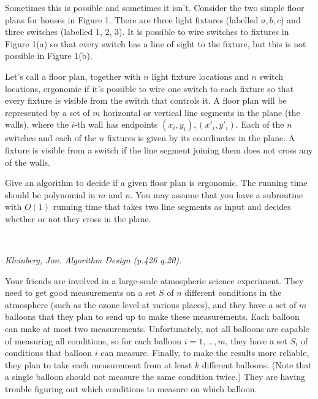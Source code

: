 \documentclass[solutionorbox,answers]{exam}
\begin{document}
\begin{questions}
Sometimes this is possible and sometimes it isn't. Consider the two
simple floor plans for houses in Figure 1. There are three light fixtures
(labelled $a, b, c$) and three switches (labelled 1, 2, 3). It is possible to wire switches to fixtures in Figure 1(a) so that every switch has a line of
sight to the fixture, but this is not possible in Figure 1(b).

Let's call a floor plan, together with $n$ light fixture locations and $n$
switch locations, ergonomic if it's possible to wire one switch to each
fixture so that every fixture is visible from the switch that controls it.
A floor plan will be represented by a set of $m$ horizontal or vertical
line segments in the plane (the walls), where the $i$-th wall has endpoints
$(x_i, y_i), (x'_i, y'_i)$. Each of the $n$ switches and each of the $n$ fixtures is given by its coordinates in the plane. A fixture is visible from a switch if the line segment joining them does not cross any of the walls.

Give an algorithm to decide if a given floor plan is ergonomic. The
running time should be polynomial in $m$ and $n$. You may assume that you
have a subroutine with $O(1)$ running time that takes two line segments as input and decides whether or not they cross in the plane.

\newpage

\begin{solutionbox}{} \\

\end{solutionbox}

\newpage

\question \textit{Kleinberg, Jon. Algorithm Design (p.426 q.20).}

Your friends are involved in a large-scale atmospheric science experiment. They need to get good measurements on a set $S$ of $n$ different
conditions in the atmosphere (such as the ozone level at various places),
and they have a set of $m$ balloons that they plan to send up to make these
measurements. Each balloon can make at most two measurements.
Unfortunately, not all balloons are capable of measuring all conditions, so for each balloon $i = 1,\ldots,m$, they have a set $S_i$ of conditions
that balloon $i$ can measure. Finally, to make the results more reliable, they
plan to take each measurement from at least $k$ different balloons. (Note
that a single balloon should not measure the same condition twice.) They
are having trouble figuring out which conditions to measure on which
balloon.


\end{questions}
\end{document}

